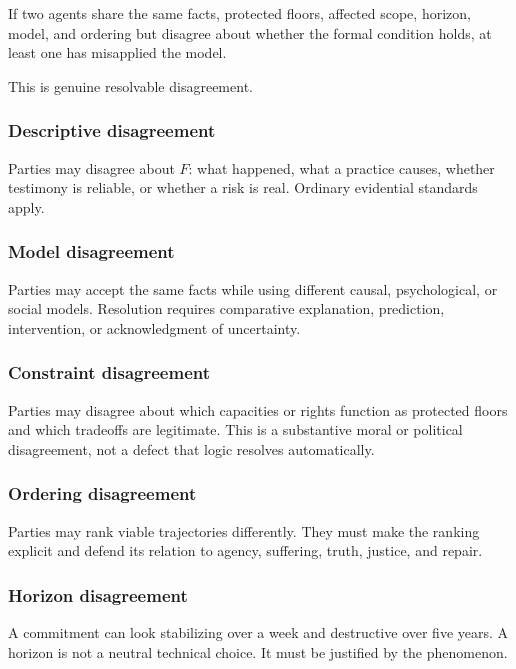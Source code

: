 \documentclass[
  11pt,
]{article}
\begin{document}
If two agents share the same facts, protected floors, affected scope,
horizon, model, and ordering but disagree about whether the formal
condition holds, at least one has misapplied the model.

This is genuine resolvable disagreement.

\subsubsection{Descriptive disagreement}\label{descriptive-disagreement}

Parties may disagree about \(F\): what happened, what a practice causes,
whether testimony is reliable, or whether a risk is real. Ordinary
evidential standards apply.

\subsubsection{Model disagreement}\label{model-disagreement}

Parties may accept the same facts while using different causal,
psychological, or social models. Resolution requires comparative
explanation, prediction, intervention, or acknowledgment of uncertainty.

\subsubsection{Constraint disagreement}\label{constraint-disagreement}

Parties may disagree about which capacities or rights function as
protected floors and which tradeoffs are legitimate. This is a
substantive moral or political disagreement, not a defect that logic
resolves automatically.

\subsubsection{Ordering disagreement}\label{ordering-disagreement}

Parties may rank viable trajectories differently. They must make the
ranking explicit and defend its relation to agency, suffering, truth,
justice, and repair.

\subsubsection{Horizon disagreement}\label{horizon-disagreement}

A commitment can look stabilizing over a week and destructive over five
years. A horizon is not a neutral technical choice. It must be justified
by the phenomenon.
\end{document}
